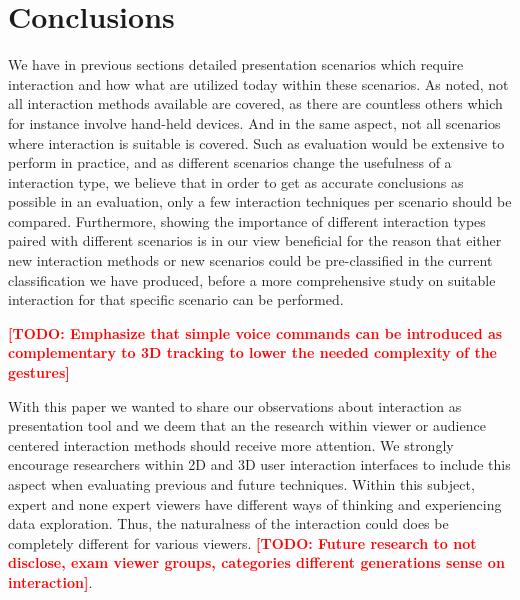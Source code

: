 \documentclass[review,journal]{vgtc}         %
\newcommand{\todo}[1]{\textbf{\textcolor{red}{[TODO: {#1}]}}}
\begin{document}
\section{Conclusions}\label{sec:conclusion}

We have in previous sections detailed presentation scenarios which require interaction and how what are utilized today within these scenarios. As noted, not all interaction methods available are covered, as there are countless others which for instance involve hand-held devices. And in the same aspect, not all scenarios where interaction is suitable is covered. Such as evaluation would be extensive to perform in practice, and as different scenarios change the usefulness of a interaction type, we believe that in order to get as accurate conclusions as possible in an evaluation, only a few interaction techniques per scenario should be compared. Furthermore, showing the importance of different interaction types paired with different scenarios is in our view beneficial for the reason that either new interaction methods or new scenarios could be pre-classified in the current classification we have produced, before a more comprehensive study on suitable interaction for that specific scenario can be performed.

\todo{Emphasize that simple voice commands can be introduced as complementary to 3D tracking to lower the needed complexity of the gestures}

With this paper we wanted to share our observations about interaction as presentation tool and we deem that an the research within viewer or audience centered interaction methods should receive more attention. We strongly encourage researchers within 2D and 3D user interaction interfaces to include this aspect when evaluating previous and future techniques.
Within this subject, expert and none expert viewers have different ways of thinking and experiencing data exploration. Thus, the naturalness of the interaction could does be completely different for various viewers. \todo{Future research to not disclose, exam viewer groups, categories different generations sense on interaction}.



\end{document}
